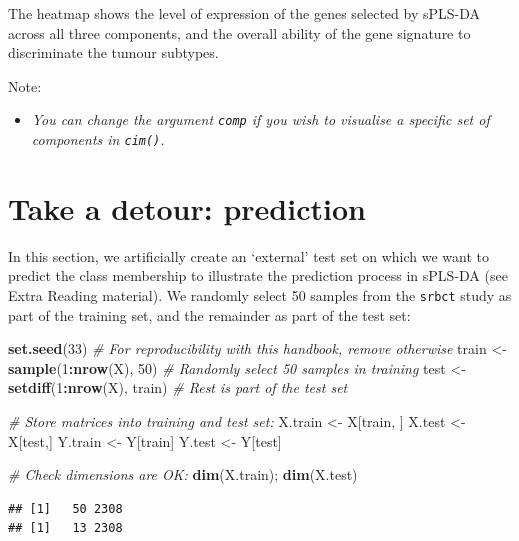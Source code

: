 \documentclass[]{book}
\newenvironment{Shaded}{\begin{snugshade}}{\end{snugshade}}
\newcommand{\CommentTok}[1]{\textcolor[rgb]{0.56,0.35,0.01}{\textit{#1}}}
\newcommand{\DecValTok}[1]{\textcolor[rgb]{0.00,0.00,0.81}{#1}}
\newcommand{\KeywordTok}[1]{\textcolor[rgb]{0.13,0.29,0.53}{\textbf{#1}}}
\newcommand{\NormalTok}[1]{#1}
\newcommand{\OperatorTok}[1]{\textcolor[rgb]{0.81,0.36,0.00}{\textbf{#1}}}
\newcommand{\StringTok}[1]{\textcolor[rgb]{0.31,0.60,0.02}{#1}}
\providecommand{\tightlist}{%
  \setlength{\itemsep}{0pt}\setlength{\parskip}{0pt}}
\begin{document}
The heatmap shows the level of expression of the genes selected by sPLS-DA across all three components, and the overall ability of the gene signature to discriminate the tumour subtypes.

Note:

\begin{itemize}
\tightlist
\item
  \emph{You can change the argument \texttt{comp} if you wish to visualise a specific set of components in \texttt{cim()}.}
\end{itemize}

\hypertarget{detour:plsda:predict}{%
\section{Take a detour: prediction}\label{detour:plsda:predict}}

In this section, we artificially create an `external' test set on which we want to predict the class membership to illustrate the prediction process in sPLS-DA (see Extra Reading material). We randomly select 50 samples from the \texttt{srbct} study as part of the training set, and the remainder as part of the test set:

\begin{Shaded}
\begin{Highlighting}[]
\KeywordTok{set.seed}\NormalTok{(}\DecValTok{33}\NormalTok{) }\CommentTok{# For reproducibility with this handbook, remove otherwise}
\NormalTok{train <-}\StringTok{ }\KeywordTok{sample}\NormalTok{(}\DecValTok{1}\OperatorTok{:}\KeywordTok{nrow}\NormalTok{(X), }\DecValTok{50}\NormalTok{)    }\CommentTok{# Randomly select 50 samples in training}
\NormalTok{test <-}\StringTok{ }\KeywordTok{setdiff}\NormalTok{(}\DecValTok{1}\OperatorTok{:}\KeywordTok{nrow}\NormalTok{(X), train) }\CommentTok{# Rest is part of the test set}

\CommentTok{# Store matrices into training and test set:}
\NormalTok{X.train <-}\StringTok{ }\NormalTok{X[train, ]}
\NormalTok{X.test <-}\StringTok{ }\NormalTok{X[test,]}
\NormalTok{Y.train <-}\StringTok{ }\NormalTok{Y[train]}
\NormalTok{Y.test <-}\StringTok{ }\NormalTok{Y[test]}

\CommentTok{# Check dimensions are OK:}
\KeywordTok{dim}\NormalTok{(X.train); }\KeywordTok{dim}\NormalTok{(X.test)}
\end{Highlighting}
\end{Shaded}

\begin{verbatim}
## [1]   50 2308
## [1]   13 2308
\end{verbatim}
\end{document}
